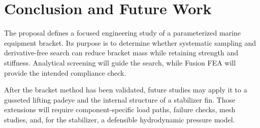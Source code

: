 \chapter{Conclusion and Future Work}

The proposal defines a focused engineering study of a parameterized marine equipment bracket. Its purpose is to determine whether systematic sampling and derivative-free search can reduce bracket mass while retaining strength and stiffness. Analytical screening will guide the search, while Fusion FEA will provide the intended compliance check.

After the bracket method has been validated, future studies may apply it to a gusseted lifting padeye and the internal structure of a stabilizer fin. Those extensions will require component-specific load paths, failure checks, mesh studies, and, for the stabilizer, a defensible hydrodynamic pressure model.
